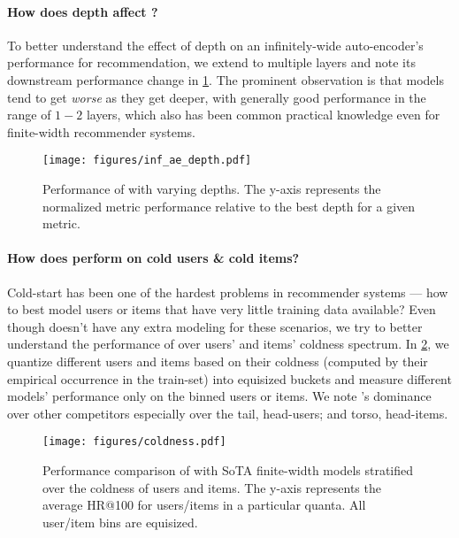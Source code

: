 \documentclass{article}
\begin{document}
\paragraph{How does depth affect \model?} To better understand the effect of depth on an infinitely-wide auto-encoder's performance for recommendation, we extend \model to multiple layers and note its downstream performance change in \cref{fig:inf_ae_depth}. The prominent observation is that models tend to get \emph{worse} as they get deeper, with generally good performance in the range of $1-2$ layers, which also has been common practical knowledge even for finite-width recommender systems.

\begin{figure}[ht!] 
    \centering
    \texttt{[image: figures/inf\_ae\_depth.pdf]}
    \caption{Performance of \model with varying depths. The y-axis represents the normalized metric \ie performance relative to the best depth for a given metric.}
    \label{fig:inf_ae_depth}
\end{figure}

\paragraph{How does \model perform on cold users \& cold items?} Cold-start has been one of the hardest problems in recommender systems --- how to best model users or items that have very little training data available? Even though \model doesn't have any extra modeling for these scenarios, we try to better understand the performance of \model over users' and items' coldness spectrum. In \cref{fig:inf_ae_coldness}, we quantize different users and items based on their coldness (computed by their empirical occurrence in the train-set) into equisized buckets and measure different models' performance only on the binned users or items. We note \model's dominance over other competitors especially over the tail, head-users; and torso, head-items. 

\begin{figure}[ht!] 
    \centering
    \texttt{[image: figures/coldness.pdf]}
    \caption{Performance comparison of \model with SoTA finite-width models stratified over the coldness of users and items. The y-axis represents the average HR@100 for users/items in a particular quanta. All user/item bins are equisized.}
    \label{fig:inf_ae_coldness}
\end{figure}
\end{document}
